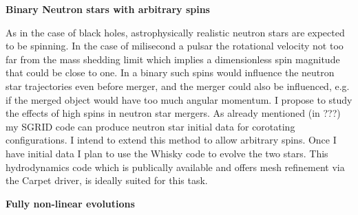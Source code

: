 \documentclass[11pt]{article}
\begin{document}
\begin{spacing}{0.95}
\noindent
{\bf Binary Neutron stars with arbitrary spins}
\smallskip

As in the case of black holes, astrophysically realistic neutron stars are
expected to be spinning. In the case of milisecond a pulsar the
rotational velocity not too far from the mass shedding limit
which implies a dimensionless spin magnitude that could
be close to one. In a binary such spins would influence the
neutron star trajectories even before merger, and the merger
could also be influenced, e.g. if the merged object would have
too much angular momentum.
I propose to study the effects of high spins in neutron star
mergers. As already mentioned (in ???) my SGRID code can produce
neutron star initial data for corotating configurations. I intend
to extend this method to allow arbitrary spins. Once I have
initial data I plan to use the Whisky
code to evolve the two stars. This hydrodynamics 
code which is publically available 
and offers mesh refinement via the Carpet driver,
is ideally suited for this task.




\medskip %
\noindent
{\bf Fully non-linear evolutions}
\smallskip


\end{spacing}
\end{document}
